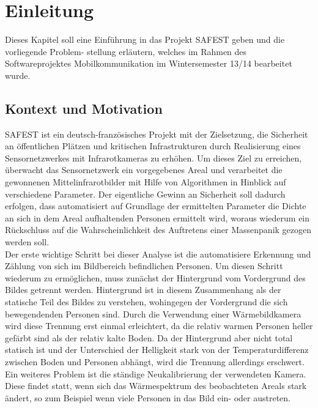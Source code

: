 \section{Einleitung}
\label{chap:einleitung}

Dieses Kapitel soll eine Einführung in das Projekt SAFEST geben und die vorliegende Problem- stellung erläutern, welches im Rahmen des Softwareprojektes Mobilkommunikation im Wintersemester 13/14 bearbeitet wurde.


\subsection{Kontext und Motivation}
\label{sec:motivation}

SAFEST ist ein deutsch-französisches Projekt mit der Zielsetzung, die Sicherheit an öffentlichen Plätzen und kritischen Infrastrukturen durch Realisierung eines Sensornetzwerkes mit Infrarotkameras zu erhöhen.
 Um dieses Ziel zu erreichen, überwacht das Sensornetzwerk ein vorgegebenes Areal und verarbeitet die gewonnenen Mittelinfrarotbilder mit Hilfe von Algorithmen in Hinblick auf verschiedene Parameter.
 Der eigentliche Gewinn an Sicherheit soll dadurch erfolgen, dass automatisiert auf Grundlage der ermittelten Parameter die Dichte an sich in dem Areal aufhaltenden Personen ermittelt wird, woraus wiederum ein Rückschluss auf die Wahrscheinlichkeit des Auftretens einer Massenpanik gezogen werden soll.\\

Der erste wichtige Schritt bei dieser Analyse ist die automatisiere Erkennung und Zählung von sich im Bildbereich befindlichen Personen.
 Um diesen Schritt wiederum zu ermöglichen, muss zunächst der Hintergrund vom Vordergrund des Bildes getrennt werden.
 Hintergrund ist in diesem Zusammenhang als der statische Teil des Bildes zu verstehen, wohingegen der Vordergrund die sich bewegendenden Personen sind.
 Durch die Verwendung einer Wärmebildkamera wird diese Trennung erst einmal erleichtert, da die relativ warmen Personen heller gefärbt sind als der relativ kalte Boden.
 Da der Hintergrund aber nicht total statisch ist und der Unterschied der Helligkeit stark von der Temperaturdifferenz zwischen Boden und Personen abhängt, wird die Trennung allerdings erschwert.
 Ein weiteres Problem ist die ständige Neukalibrierung der verwendeten Kamera.
 Diese findet statt, wenn sich das Wärmespektrum des beobachteten Areals stark ändert, so zum Beispiel wenn viele Personen in das Bild ein- oder austreten.\\

